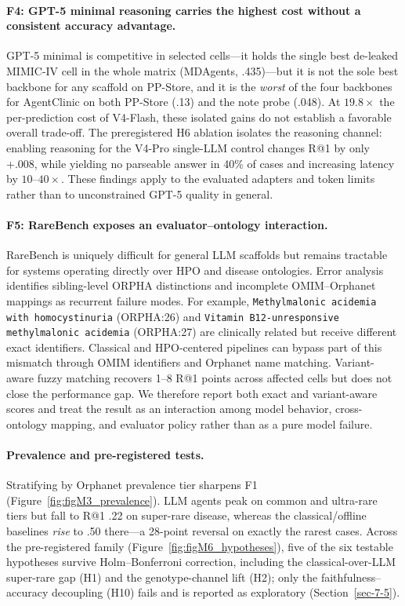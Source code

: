 \documentclass[letterpaper]{article} %
\begin{document}
\paragraph{F4: GPT-5 minimal reasoning carries the highest cost without a consistent accuracy advantage.}
GPT-5 minimal is competitive in selected cells---it holds the single best de-leaked MIMIC-IV cell in the whole matrix (MDAgents, .435)---but it is not the sole best backbone for any scaffold on PP-Store, and it is the \emph{worst} of the four backbones for AgentClinic on both PP-Store (.13) and the note probe (.048). At $19.8\times$ the per-prediction cost of V4-Flash, these isolated gains do not establish a favorable overall trade-off. The preregistered H6 ablation isolates the reasoning channel: enabling reasoning for the V4-Pro single-LLM control changes R@1 by only +.008, while yielding no parseable answer in 40\% of cases and increasing latency by $10$--$40\times$. These findings apply to the evaluated adapters and token limits rather than to unconstrained GPT-5 quality in general.

\paragraph{F5: RareBench exposes an evaluator--ontology interaction.}
RareBench is uniquely difficult for general LLM scaffolds but remains tractable for systems operating directly over HPO and disease ontologies. Error analysis identifies sibling-level ORPHA distinctions and incomplete OMIM--Orphanet mappings as recurrent failure modes. For example, \texttt{Methylmalonic acidemia with homocystinuria} (ORPHA:26) and \texttt{Vitamin B12-unresponsive methylmalonic acidemia} (ORPHA:27) are clinically related but receive different exact identifiers. Classical and HPO-centered pipelines can bypass part of this mismatch through OMIM identifiers and Orphanet name matching. Variant-aware fuzzy matching recovers 1--8 R@1 points across affected cells but does not close the performance gap. We therefore report both exact and variant-aware scores and treat the result as an interaction among model behavior, cross-ontology mapping, and evaluator policy rather than as a pure model failure.

\paragraph{Prevalence and pre-registered tests.}
Stratifying by Orphanet prevalence tier sharpens F1 (Figure~\ref{fig:figM3_prevalence}). LLM agents peak on common and ultra-rare tiers but fall to R@1 .22 on super-rare disease, whereas the classical/offline baselines \emph{rise} to .50 there---a 28-point reversal on exactly the rarest cases. Across the pre-registered family (Figure~\ref{fig:figM6_hypotheses}), five of the six testable hypotheses survive Holm--Bonferroni correction, including the classical-over-LLM super-rare gap (H1) and the genotype-channel lift (H2); only the faithfulness--accuracy decoupling (H10) fails and is reported as exploratory (Section~\ref{sec-7-5}).
\end{document}
